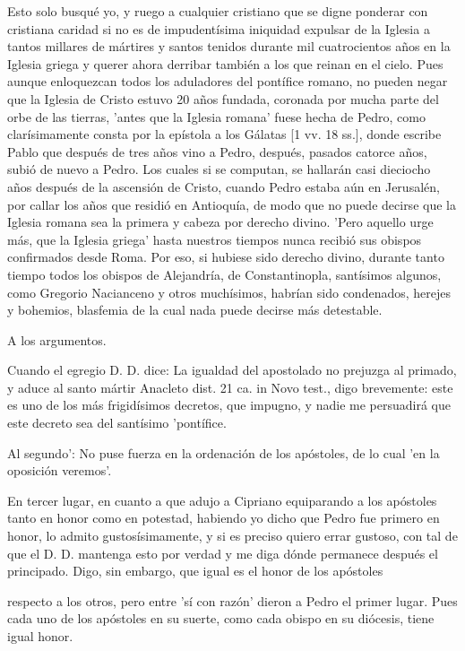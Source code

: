 Esto solo busqué yo, y ruego a cualquier cristiano que se digne ponderar con cristiana caridad si no es de impudentísima iniquidad expulsar de la Iglesia a tantos millares de mártires y santos tenidos durante mil cuatrocientos años en la Iglesia griega y querer ahora derribar también a los que reinan en el cielo. Pues aunque enloquezcan todos los aduladores del pontífice romano, no pueden negar que la Iglesia de Cristo estuvo 20 años fundada, coronada por mucha parte del orbe de las tierras, 'antes que la Iglesia romana' fuese hecha de Pedro, como clarísimamente consta por la epístola a los Gálatas [1 vv. 18 ss.], donde escribe Pablo que después de tres años vino a Pedro, después, pasados catorce años, subió de nuevo a Pedro. Los cuales si se computan, se hallarán casi dieciocho años después de la ascensión de Cristo, cuando Pedro estaba aún en Jerusalén, por callar los años que residió en Antioquía, de modo que no puede decirse que la Iglesia romana sea la primera y cabeza por derecho divino. 'Pero aquello urge más, que la Iglesia griega' hasta nuestros tiempos nunca recibió sus obispos confirmados desde Roma. Por eso, si hubiese sido derecho divino, durante tanto tiempo todos los obispos de Alejandría, de Constantinopla, santísimos algunos, como Gregorio Nacianceno y otros muchísimos, habrían sido condenados, herejes y bohemios, blasfemia de la cual nada puede decirse más detestable.

A los argumentos.

Cuando el egregio D. D. dice: La igualdad del apostolado no prejuzga al primado, y aduce al santo mártir Anacleto dist. 21 ca. in Novo test., digo brevemente: este es uno de los más frigidísimos decretos, que impugno, y nadie me persuadirá que este decreto sea del santísimo 'pontífice.

Al segundo': No puse fuerza en la ordenación de los apóstoles, de lo cual 'en la oposición veremos'.

En tercer lugar, en cuanto a que adujo a Cipriano equiparando a los apóstoles tanto en honor como en potestad, habiendo yo dicho que Pedro fue primero en honor, lo admito gustosísimamente, y si es preciso quiero errar gustoso, con tal de que el D. D. mantenga esto por verdad y me diga dónde permanece después el principado. Digo, sin embargo, que igual es el honor de los apóstoles

respecto a los otros, pero entre 'sí con razón' dieron a Pedro el primer lugar. Pues cada uno de los apóstoles en su suerte, como cada obispo en su diócesis, tiene igual honor.

